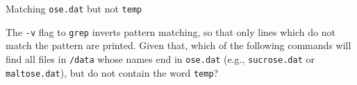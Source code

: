 \documentclass{beamer}
\begin{document}

\begin{frame}{Matching \texttt{ose.dat} but not \texttt{temp}}

The \texttt{-v} flag to \texttt{grep} inverts pattern matching, so that only lines which do not match the pattern are printed. Given that, which of the following commands will find all files in \texttt{/data} whose names end in \texttt{ose.dat} (e.g., \texttt{sucrose.dat} or \texttt{maltose.dat}), but do not contain the word \texttt{temp}?



\end{frame}

\end{document}

